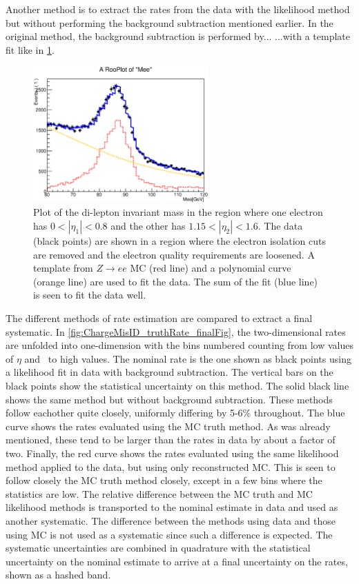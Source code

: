 Another method is to extract the rates from the data with the 
likelihood method but without performing the background
subtraction mentioned earlier. In the original method, 
the background subtraction is performed by... 
...with a template fit like in \fig\ref{fig:chargemisid_fitexample}.

\begin{figure}[htp]
\centering
\includegraphics[width=0.6\textwidth]{figures/ChargeMisID/Tot_Polynomial_0_2.eps}
\caption{Plot of the di-lepton invariant mass 
in the region where one electron has $0 < |\eta_1| < 0.8$
and the other has $1.15 < |\eta_2|<1.6$. The data (black points)
are shown in a region where the electron isolation cuts are removed
and the electron quality requirements are loosened.
A template from $Z\rightarrow ee$ MC (red line) and a polynomial
curve (orange line) are used to fit the data. The sum of the fit
(blue line) is seen to fit the data well.}
\label{fig:chargemisid_fitexample}
\end{figure} 


The different methods of rate estimation are compared to extract
a final systematic. In \fig\ref{fig:ChargeMisID_truthRate_finalFig},
the two-dimensional rates are unfolded into one-dimension
with the bins numbered counting from low values of $\eta$ and \pt~to
high values. The nominal rate is the one shown as black points
using a likelihood fit in data with background subtraction. The vertical
bars on the black points show the statistical uncertainty on this method.
The solid black line shows the same method but without background subtraction.
These methods follow eachother quite closely, uniformly differing by 
5-6\% throughout.  The blue curve shows the rates evaluated
using the MC truth method. As was already mentioned, these tend
to be larger than the rates in data by about a factor of two. Finally, 
the red curve shows the rates evaluated using the same likelihood method
applied to the data, but using only reconstructed MC. This is seen to follow
closely the MC truth method closely, except in a few bins where the statistics
are low. The relative difference between the MC truth and MC likelihood methods
is transported to the nominal estimate in data and used as another systematic.
The difference between the methods using data and those using MC is not
used as a systematic since such a difference is expected.
The systematic uncertainties are combined in quadrature with the statistical
uncertainty on the nominal estimate to arrive at a final uncertainty on the
rates, shown as a hashed band.


